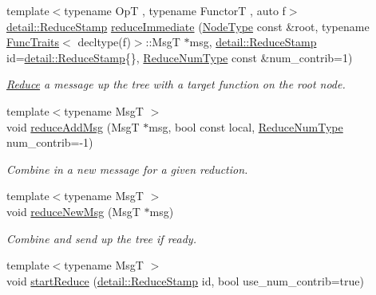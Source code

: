 \begin{DoxyCompactItemize}
{\footnotesize template$<$typename OpT , typename FunctorT , auto f$>$ }\\\hyperlink{namespacevt_1_1collective_1_1reduce_1_1detail_abcd205dec83706f347d55c7528bf2664}{detail\+::\+Reduce\+Stamp} \hyperlink{structvt_1_1collective_1_1reduce_1_1_reduce_ad5b5b32dbde405974970f5bdbd24d5d9}{reduce\+Immediate} (\hyperlink{namespacevt_a866da9d0efc19c0a1ce79e9e492f47e2}{Node\+Type} const \&root, typename \hyperlink{structvt_1_1_func_traits}{Func\+Traits}$<$ decltype(f)$>$\+::MsgT $\ast$msg, \hyperlink{namespacevt_1_1collective_1_1reduce_1_1detail_abcd205dec83706f347d55c7528bf2664}{detail\+::\+Reduce\+Stamp} id=\hyperlink{namespacevt_1_1collective_1_1reduce_1_1detail_abcd205dec83706f347d55c7528bf2664}{detail\+::\+Reduce\+Stamp}\{\}, \hyperlink{structvt_1_1collective_1_1reduce_1_1_reduce_a6c3e63aca10c31d2823b0b18cf9762a4}{Reduce\+Num\+Type} const \&num\+\_\+contrib=1)
\begin{DoxyCompactList}\small\item\em \hyperlink{structvt_1_1collective_1_1reduce_1_1_reduce}{Reduce} a message up the tree with a target function on the root node. \end{DoxyCompactList}\item 
{\footnotesize template$<$typename MsgT $>$ }\\void \hyperlink{structvt_1_1collective_1_1reduce_1_1_reduce_a18df32ceadd6b55979c8fd7e85f613e4}{reduce\+Add\+Msg} (MsgT $\ast$msg, bool const local, \hyperlink{structvt_1_1collective_1_1reduce_1_1_reduce_a6c3e63aca10c31d2823b0b18cf9762a4}{Reduce\+Num\+Type} num\+\_\+contrib=-\/1)
\begin{DoxyCompactList}\small\item\em Combine in a new message for a given reduction. \end{DoxyCompactList}\item 
{\footnotesize template$<$typename MsgT $>$ }\\void \hyperlink{structvt_1_1collective_1_1reduce_1_1_reduce_a0642df1a1e52d7da269d8fb23dfc193f}{reduce\+New\+Msg} (MsgT $\ast$msg)
\begin{DoxyCompactList}\small\item\em Combine and send up the tree if ready. \end{DoxyCompactList}\item 
{\footnotesize template$<$typename MsgT $>$ }\\void \hyperlink{structvt_1_1collective_1_1reduce_1_1_reduce_ad8849fa013a4b3e3f795ceeb103026e4}{start\+Reduce} (\hyperlink{namespacevt_1_1collective_1_1reduce_1_1detail_abcd205dec83706f347d55c7528bf2664}{detail\+::\+Reduce\+Stamp} id, bool use\+\_\+num\+\_\+contrib=true)

\end{DoxyCompactItemize}
